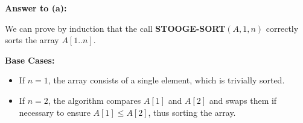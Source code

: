 \documentclass[10pt,letter,notitlepage]{article}
\begin{document}
\begin{Answer}
%
%
%
%
%
%
%

\textbf{Answer to (a):}

We can prove by induction that the call \textbf{STOOGE-SORT}$(A, 1, n)$ correctly sorts the array $A[1..n]$.

\textbf{Base Cases:}

\begin{itemize}
\item If $n = 1$, the array consists of a single element, which is trivially sorted.
\item If $n = 2$, the algorithm compares $A[1]$ and $A[2]$ and swaps them if necessary to ensure $A[1] \leq A[2]$, thus sorting the array.
\end{itemize}


\end{Answer}
\end{document}
